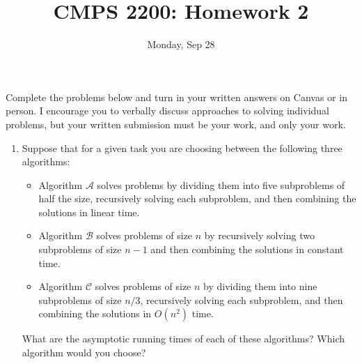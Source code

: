 \documentclass[12pt]{article}
\begin{document}
\title{\sf CMPS 2200: Homework 2}
\author{}
\date{\vspace{-.5in}\sf Monday, Sep 28}
\maketitle\thispagestyle{empty}


Complete the problems below and turn in your written answers on Canvas
or in person. I encourage you to
verbally discuss approaches to solving individual problems, but your written
submission must be your work, and only your work.

\begin{enumerate}

\item Suppose that for a given task you are choosing between the following three algorithms:
  
  \begin{itemize}
    \item Algorithm $\mathcal{A}$ solves problems by dividing them into five
      subproblems of half the size, recursively solving each
      subproblem, and then combining the solutions in linear time.
      \item Algorithm $\mathcal{B}$ solves problems of size $n$ by recursively
        solving two subproblems of size $n-1$ and then combining the
        solutions in constant time.
        \item Algorithm $\mathcal{C}$ solves problems of size $n$ by
          dividing them into nine subproblems of size $n/3$,
          recursively solving each subproblem, and then combining the
          solutions in $O(n^2)$ time.
        \end{itemize}

        What are the asymptotic running times of each of these
        algorithms? Which algorithm would you choose?

\end{enumerate}
\end{document}
